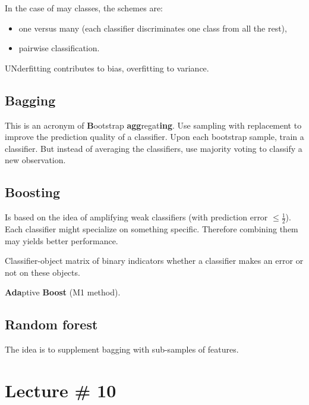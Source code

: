 \documentclass[a4paper]{article}
\begin{document}
In the case of may classes, the schemes are:
\begin{itemize}
	\item one versus many (each classifier discriminates one class from all the rest),
	\item pairwise classification.
\end{itemize}

UNderfitting contributes to bias, overfitting to variance.

\subsection{Bagging} %
\label{sub:bagging}

This is an acronym of \textbf{B}ootstrap \textbf{agg}regat\textbf{ing}.
Use sampling with replacement to improve the prediction quality of a classifier.
Upon each bootstrap sample, train a classifier. But instead of averaging the classifiers,
use majority voting to classify a new observation. 


\subsection{Boosting} %
\label{sub:boosting}

Is based on the idea of amplifying weak classifiers (with prediction error $\leq\frac{1}{2}$).
Each classifier might specialize on something specific. Therefore combining them may yields better performance.

Classifier-object matrix of binary indicators whether a classifier makes an error or not on these objects.

\textbf{Ada}ptive \textbf{Boost} (M1 method).


\subsection{Random forest} %
\label{sub:random_forest}

The idea is to supplement bagging with sub-samples of features.



\section{Lecture \# 10} %
\label{sec:lecture_10}
\end{document}
